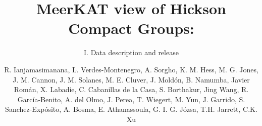 \documentclass{aa}
\begin{document}
 


   \title{MeerKAT view of Hickson Compact Groups:}

   \subtitle{I. Data description and release}

\author{R. Ianjamasimanana,
      L. Verdes-Montenegro,
      A. Sorgho,
      K. M. Hess,
      M. G. Jones,
      J. M. Cannon,
      J. M. Solanes,
      M. E. Cluver,
      J. Mold\'on,
      B. Namumba,
      Javier Rom\'an,
      X. Labadie,
      C. Cabanillas de la Casa,
      S. Borthakur,
      Jing Wang,
      R. Garc\'ia-Benito,
      A. del Olmo,
      J. Perea,
      T. Wiegert,
      M. Yun,
      J. Garrido,
      S. Sanchez-Exp\'osito,
      A. Bosma,
      E. Athanassoula,
      G. I. G. J\'ozsa,
      T.H. Jarrett,
      C.K. Xu
      }
\end{document}
